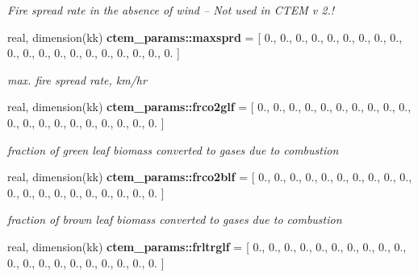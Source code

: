 \begin{DoxyCompactItemize}
\begin{DoxyCompactList}\small\item\em Fire spread rate in the absence of wind -- Not used in C\+T\+E\+M v 2.! \end{DoxyCompactList}\item 
\hypertarget{namespacectem__params_a9eac43cb4ce26be279a87b758a8dece2}{}real, dimension(kk) {\bfseries ctem\+\_\+params\+::maxsprd} = \mbox{[} 0., 0., 0., 0., 0., 0., 0., 0., 0., 0., 0., 0., 0., 0., 0., 0., 0., 0., 0., 0. \mbox{]}\label{namespacectem__params_a9eac43cb4ce26be279a87b758a8dece2}

\begin{DoxyCompactList}\small\item\em max. fire spread rate, km/hr \end{DoxyCompactList}\item 
\hypertarget{namespacectem__params_a375be0a1145e49eeea706777032433d0}{}real, dimension(kk) {\bfseries ctem\+\_\+params\+::frco2glf} = \mbox{[} 0., 0., 0., 0., 0., 0., 0., 0., 0., 0., 0., 0., 0., 0., 0., 0., 0., 0., 0., 0. \mbox{]}\label{namespacectem__params_a375be0a1145e49eeea706777032433d0}

\begin{DoxyCompactList}\small\item\em fraction of green leaf biomass converted to gases due to combustion \end{DoxyCompactList}\item 
\hypertarget{namespacectem__params_a9a3a13ca8c1ce9a4b4eafa3ce20308f1}{}real, dimension(kk) {\bfseries ctem\+\_\+params\+::frco2blf} = \mbox{[} 0., 0., 0., 0., 0., 0., 0., 0., 0., 0., 0., 0., 0., 0., 0., 0., 0., 0., 0., 0. \mbox{]}\label{namespacectem__params_a9a3a13ca8c1ce9a4b4eafa3ce20308f1}

\begin{DoxyCompactList}\small\item\em fraction of brown leaf biomass converted to gases due to combustion \end{DoxyCompactList}\item 
\hypertarget{namespacectem__params_ab9c6dc0514620728eecf50eb9c37892e}{}real, dimension(kk) {\bfseries ctem\+\_\+params\+::frltrglf} = \mbox{[} 0., 0., 0., 0., 0., 0., 0., 0., 0., 0., 0., 0., 0., 0., 0., 0., 0., 0., 0., 0. \mbox{]}\label{namespacectem__params_ab9c6dc0514620728eecf50eb9c37892e}


\end{DoxyCompactItemize}
